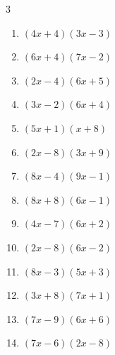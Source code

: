 \begin{multicols}{3}
\begin{enumerate}
  \item $(4x+4)(3x-3)$


  \item $(6x+4)(7x-2)$


  \item $(2x-4)(6x+5)$


  \item $(3x-2)(6x+4)$


  \item $(5x+1)(x+8)$


  \item $(2x-8)(3x+9)$


  \item $(8x-4)(9x-1)$


  \item $(8x+8)(6x-1)$


  \item $(4x-7)(6x+2)$


  \item $(2x-8)(6x-2)$


  \item $(8x-3)(5x+3)$


\columnbreak %

\resetques

  \item $(3x+8)(7x+1)$


  \item $(7x-9)(6x+6)$


  \item $(7x-6)(2x-8)$



\end{enumerate}
\end{multicols}
